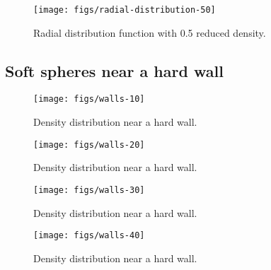 \documentclass[letterpaper,twocolumn,amsmath,amssymb,prb]{revtex4-1}
\begin{document}
\begin{figure}
\begin{center}
\texttt{[image: figs/radial-distribution-50]}
\end{center}
\caption{Radial distribution function with 0.5 reduced density.}
\label{fig:radial-distribution-50}
\end{figure}


\subsection{Soft spheres near a hard wall}

\begin{figure}
\begin{center}
\texttt{[image: figs/walls-10]}
\end{center}
\caption{Density distribution near a hard wall.}
\label{fig:walls-10}
\end{figure}

\begin{figure}
\begin{center}
\texttt{[image: figs/walls-20]}
\end{center}
\caption{Density distribution near a hard wall.}
\label{fig:walls-20}
\end{figure}

\begin{figure}
\begin{center}
\texttt{[image: figs/walls-30]}
\end{center}
\caption{Density distribution near a hard wall.}
\label{fig:walls-30}
\end{figure}

\begin{figure}
\begin{center}
\texttt{[image: figs/walls-40]}
\end{center}
\caption{Density distribution near a hard wall.}
\label{fig:walls-40}
\end{figure}

\end{document}
